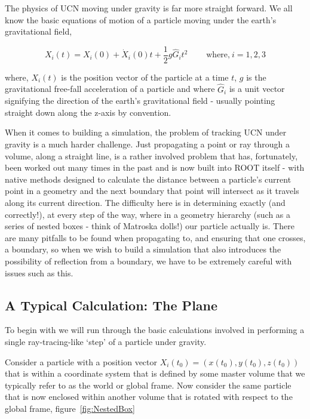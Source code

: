 \documentclass[11pt,a4paper,oneside]{article}
\begin{document}
The physics of UCN moving under gravity is far more straight forward. We all know the basic equations of motion of a particle moving under the earth's gravitational field,

\begin{equation}
X_{i}(t) = X_{i}(0) + \dot{X}_{i}(0)t + \frac{1}{2}g\hat{G}_{i}t^{2} \ \ \ \ \ \ \ \ \ \ \mbox{where,} \ i = 1, 2, 3
\label{eqn:GravitationalMotion}
\end{equation}

where, $X_{i}(t)$ is the position vector of the particle at a time $t$, $g$ is the gravitational free-fall acceleration of a particle and where $\hat{G}_{i}$ is a unit vector signifying the direction of the earth's gravitational field - usually pointing straight down along the z-axis by convention. 

When it comes to building a simulation, the problem of tracking UCN under gravity is a much harder challenge. Just propagating a point or ray through a volume, along a straight line, is a rather involved problem that has, fortunately,  been worked out many times in the past and is now built into ROOT itself - with native methods designed to calculate the distance between a particle's current point in a geometry and the next boundary that point will intersect as it travels along its current direction. The difficulty here is in determining exactly (and correctly!), at every step of the way, where in a geometry hierarchy (such as a series of nested boxes - think of Matroska dolls!) our particle actually is. There are many pitfalls to be found when propagating to, and ensuring that one crosses, a boundary, so when we wish to build a simulation that also introduces the possibility of reflection from a boundary, we have to be extremely careful with issues such as this. 

\subsection{A Typical Calculation: The Plane}

To begin with we will run through the basic calculations involved in performing a single ray-tracing-like `step' of a particle under gravity. 

Consider a particle with a position vector $X_{i}(t_{0}) = (x(t_{0}), y(t_{0}), z(t_{0}))$ that is within a coordinate system that is defined by some master volume that we typically refer to as the world or global frame. Now consider the same particle that is now enclosed within another volume that is rotated with respect to the global frame, figure~\ref{fig:NestedBox}
\end{document}
